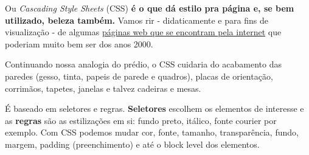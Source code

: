 Ou \emph{Cascading Style Sheets} (CSS) \textbf{é o que dá estilo pra
página e, se bem utilizado, beleza também. }Vamos rir - didaticamente e
para fins de visualização - de algumas
\href{https://www.elegantthemes.com/blog/resources/bad-web-design-a-look-at-the-most-hilariously-terrible-websites-from-around-the-web}{páginas
web que se encontram pela internet} que poderiam muito bem ser dos anos
2000.

Continuando nossa analogia do prédio, o CSS cuidaria do acabamento das
paredes (gesso, tinta, papeis de parede e quadros), placas de
orientação, corrimãos, tapetes, janelas e talvez cadeiras e mesas.

É baseado em seletores e regras. \textbf{Seletores} escolhem os
elementos de interesse e as \textbf{regras}
são as estilizações em si:
fundo preto, itálico, fonte courier por exemplo. Com CSS podemos mudar
cor, fonte, tamanho, transparência, fundo, margem, padding
(preenchimento) e até o block level dos elementos.
